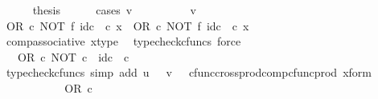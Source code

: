 \begin{isabellebody}
\ \ \ \ \isamarkupfalse%
\ {\isacharquery}{\kern0pt}thesis\ \isanewline
\ \ \ \ \isamarkupfalse%
{\isacharparenleft}{\kern0pt}cases\ {\isachardoublequoteopen}v\ {\isacharequal}{\kern0pt}\ {\isasymt}{\isachardoublequoteclose}{\isacharparenright}{\kern0pt}\isanewline
\ \ \ \ \ \ \isamarkupfalse%
\ {\isachardoublequoteopen}v\ {\isacharequal}{\kern0pt}\ {\isasymt}{\isachardoublequoteclose}\isanewline
\ \ \ \ \ \ \isamarkupfalse%
\ {\isachardoublequoteopen}{\isacharparenleft}{\kern0pt}OR\ {\isasymcirc}\isactrlsub c\ NOT\ {\isasymtimes}\isactrlsub f\ id\isactrlsub c\ {\isasymOmega}{\isacharparenright}{\kern0pt}\ {\isasymcirc}\isactrlsub c\ x\ {\isacharequal}{\kern0pt}\ OR\ {\isasymcirc}\isactrlsub c\ {\isacharparenleft}{\kern0pt}NOT\ {\isasymtimes}\isactrlsub f\ id\isactrlsub c\ {\isasymOmega}{\isacharparenright}{\kern0pt}\ {\isasymcirc}\isactrlsub c\ x{\isachardoublequoteclose}\isanewline
\ \ \ \ \ \ \ \ \isamarkupfalse%
\ comp{\isacharunderscore}{\kern0pt}associative{}\ x{\isacharunderscore}{\kern0pt}type\ \isamarkupfalse%
\ {\isacharparenleft}{\kern0pt}typecheck{\isacharunderscore}{\kern0pt}cfuncs{\isacharcomma}{\kern0pt}\ force{\isacharparenright}{\kern0pt}\isanewline
\ \ \ \ \ \ \isamarkupfalse%
\ \isamarkupfalse%
\ {\isachardoublequoteopen}{\isachardot}{\kern0pt}{\isachardot}{\kern0pt}{\isachardot}{\kern0pt}\ {\isacharequal}{\kern0pt}\ OR\ {\isasymcirc}\isactrlsub c\ {\isasymlangle}NOT\ {\isasymcirc}\isactrlsub c\ {\isasymf}{\isacharcomma}{\kern0pt}\ id\isactrlsub c\ {\isasymOmega}\ {\isasymcirc}\isactrlsub c\ {\isasymt}{\isasymrangle}{\isachardoublequoteclose}\isanewline
\ \ \ \ \ \ \ \ \isamarkupfalse%
\ {\isacharparenleft}{\kern0pt}typecheck{\isacharunderscore}{\kern0pt}cfuncs{\isacharcomma}{\kern0pt}\ simp\ add{\isacharcolon}{\kern0pt}\ {\isacartoucheopen}u\ {\isacharequal}{\kern0pt}\ {\isasymf}{\isacartoucheclose}\ {\isacartoucheopen}v\ {\isacharequal}{\kern0pt}\ {\isasymt}{\isacartoucheclose}\ cfunc{\isacharunderscore}{\kern0pt}cross{\isacharunderscore}{\kern0pt}prod{\isacharunderscore}{\kern0pt}comp{\isacharunderscore}{\kern0pt}cfunc{\isacharunderscore}{\kern0pt}prod\ x{\isacharunderscore}{\kern0pt}form{\isacharparenright}{\kern0pt}\isanewline
\ \ \ \ \ \ \isamarkupfalse%
\ \isamarkupfalse%
\ {\isachardoublequoteopen}{\isachardot}{\kern0pt}{\isachardot}{\kern0pt}{\isachardot}{\kern0pt}\ {\isacharequal}{\kern0pt}\ OR\ {\isasymcirc}\isactrlsub c\ {\isasymlangle}{\isasymt}{\isacharcomma}{\kern0pt}\ {\isasymt}{\isasymrangle}{\isachardoublequoteclose}\isanewline

\end{isabellebody}
